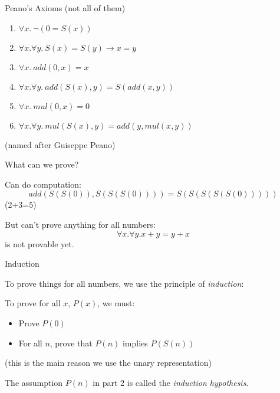 \documentclass[xetex,aspectratio=169,14pt,hyperref={pdfpagelabels=true,pdflang={en-GB}}]{beamer}
\begin{document}
\begin{frame}
  {Peano's Axioms (not all of them)}

  \begin{enumerate}
  \item $\forall x.~\lnot(0 = S(x))$
  \item $\forall x. \forall y.~S(x) = S(y) \to x = y$
  \item $\forall x.~add(0,x) = x$
  \item $\forall x.\forall y.~add(S(x),y) = S(add(x,y))$
  \item $\forall x.~mul(0,x) = 0$
  \item $\forall x. \forall y.~mul(S(x),y) = add(y,mul(x,y))$
  \end{enumerate}

  \bigskip

  (named after Guiseppe Peano)
\end{frame}

\begin{frame}
  {What can we prove?}

  Can do computation:
  \begin{displaymath}
    add(S(S(0)),S(S(S(0)))) = S(S(S(S(S(0)))))
  \end{displaymath}
  \qquad \qquad \textcolor{black!60}{(2+3=5)}

  \bigskip

  But can't prove anything for all numbers:
  \begin{displaymath}
    \forall x. \forall y. x + y = y + x
  \end{displaymath}
  is not provable yet.
\end{frame}

\begin{frame}
  {Induction}

  To prove things for all numbers, we use the principle of \emph{induction}:

  \bigskip

  To prove for all $x$, $P(x)$, we must:
  \begin{itemize}
  \item Prove $P(0)$
  \item For all $n$, prove that $P(n)$ implies $P(S(n))$
  \end{itemize}
  \textcolor{black!60}{(this is the main reason we use the unary representation)}

  \bigskip

  The assumption $P(n)$ in part 2 is called the \emph{induction hypothesis}.
\end{frame}
\end{document}
